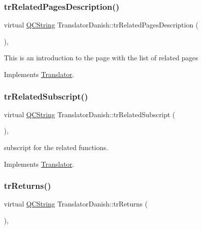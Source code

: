 \subsubsection{\texorpdfstring{trRelatedPagesDescription()}{trRelatedPagesDescription()}}
{\footnotesize\ttfamily virtual \mbox{\hyperlink{class_q_c_string}{Q\+C\+String}} Translator\+Danish\+::tr\+Related\+Pages\+Description (\begin{DoxyParamCaption}{ }\end{DoxyParamCaption})\hspace{0.3cm}{\ttfamily [inline]}, {\ttfamily [virtual]}}

This is an introduction to the page with the list of related pages 

Implements \mbox{\hyperlink{class_translator}{Translator}}.

\mbox{\label{class_translator_danish_a341494adb2fbb97abf12bff9871c0b1c}} 
\subsubsection{\texorpdfstring{trRelatedSubscript()}{trRelatedSubscript()}}
{\footnotesize\ttfamily virtual \mbox{\hyperlink{class_q_c_string}{Q\+C\+String}} Translator\+Danish\+::tr\+Related\+Subscript (\begin{DoxyParamCaption}{ }\end{DoxyParamCaption})\hspace{0.3cm}{\ttfamily [inline]}, {\ttfamily [virtual]}}

subscript for the related functions. 

Implements \mbox{\hyperlink{class_translator}{Translator}}.

\mbox{\label{class_translator_danish_a6edba281f68c0ec0b7635cc7658dd4ca}} 
\subsubsection{\texorpdfstring{trReturns()}{trReturns()}}
{\footnotesize\ttfamily virtual \mbox{\hyperlink{class_q_c_string}{Q\+C\+String}} Translator\+Danish\+::tr\+Returns (\begin{DoxyParamCaption}{ }\end{DoxyParamCaption})\hspace{0.3cm}{\ttfamily [inline]}, {\ttfamily [virtual]}}

